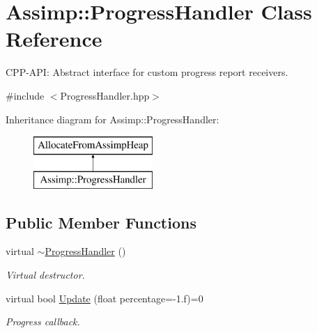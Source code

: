 \hypertarget{class_assimp_1_1_progress_handler}{\section{Assimp\-:\-:Progress\-Handler Class Reference}
\label{class_assimp_1_1_progress_handler}
}


C\-P\-P-\/\-A\-P\-I\-: Abstract interface for custom progress report receivers.  




{\ttfamily \#include $<$Progress\-Handler.\-hpp$>$}

Inheritance diagram for Assimp\-:\-:Progress\-Handler\-:\begin{figure}[H]
\begin{center}
\leavevmode
\includegraphics[height=2.000000cm]{class_assimp_1_1_progress_handler}
\end{center}
\end{figure}
\subsection*{Public Member Functions}
\begin{DoxyCompactItemize}
\item 
\hypertarget{class_assimp_1_1_progress_handler_a3ec465a62e1feaae00f585ca0cffb81e}{virtual \hyperlink{class_assimp_1_1_progress_handler_a3ec465a62e1feaae00f585ca0cffb81e}{$\sim$\-Progress\-Handler} ()}\label{class_assimp_1_1_progress_handler_a3ec465a62e1feaae00f585ca0cffb81e}

\begin{DoxyCompactList}\small\item\em Virtual destructor. \end{DoxyCompactList}\item 
virtual bool \hyperlink{class_assimp_1_1_progress_handler_ab08a1d300d434f6dd86ca41747cba448}{Update} (float percentage=-\/1.f)=0
\begin{DoxyCompactList}\small\item\em Progress callback. \end{DoxyCompactList}\end{DoxyCompactItemize}
